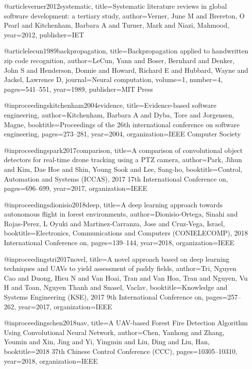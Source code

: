 @article{verner2012systematic,
  title={Systematic literature reviews in global software development: a tertiary study},
  author={Verner, June M and Brereton, O Pearl and Kitchenham, Barbara A and Turner, Mark and Niazi, Mahmood},
  year={2012},
  publisher={IET}
}

@article{lecun1989backpropagation,
  title={Backpropagation applied to handwritten zip code recognition},
  author={LeCun, Yann and Boser, Bernhard and Denker, John S and Henderson, Donnie and Howard, Richard E and Hubbard, Wayne and Jackel, Lawrence D},
  journal={Neural computation},
  volume={1},
  number={4},
  pages={541--551},
  year={1989},
  publisher={MIT Press}
}

@inproceedings{kitchenham2004evidence,
  title={Evidence-based software engineering},
  author={Kitchenham, Barbara A and Dyba, Tore and Jorgensen, Magne},
  booktitle={Proceedings of the 26th international conference on software engineering},
  pages={273--281},
  year={2004},
  organization={IEEE Computer Society}
}

@inproceedings{park2017comparison,
  title={A comparison of convolutional object detectors for real-time drone tracking using a PTZ camera},
  author={Park, Jihun and Kim, Dae Hoe and Shin, Young Sook and Lee, Sang-ho},
  booktitle={Control, Automation and Systems (ICCAS), 2017 17th International Conference on},
  pages={696--699},
  year={2017},
  organization={IEEE}
}

@inproceedings{dionisio2018deep,
  title={A deep learning approach towards autonomous flight in forest environments},
  author={Dionisio-Ortega, Sinahi and Rojas-Perez, L Oyuki and Martinez-Carranza, Jose and Cruz-Vega, Israel},
  booktitle={Electronics, Communications and Computers (CONIELECOMP), 2018 International Conference on},
  pages={139--144},
  year={2018},
  organization={IEEE}
}

@inproceedings{tri2017novel,
  title={A novel approach based on deep learning techniques and UAVs to yield assessment of paddy fields},
  author={Tri, Nguyen Cao and Duong, Hieu N and Van Hoai, Tran and Van Hoa, Tran and Nguyen, Vu H and Toan, Nguyen Thanh and Snasel, Vaclav},
  booktitle={Knowledge and Systems Engineering (KSE), 2017 9th International Conference on},
  pages={257--262},
  year={2017},
  organization={IEEE}
}

@inproceedings{chen2018uav,
  title={A UAV-based Forest Fire Detection Algorithm Using Convolutional Neural Network},
  author={Chen, Yanhong and Zhang, Youmin and Xin, Jing and Yi, Yingmin and Liu, Ding and Liu, Han},
  booktitle={2018 37th Chinese Control Conference (CCC)},
  pages={10305--10310},
  year={2018},
  organization={IEEE}
}

